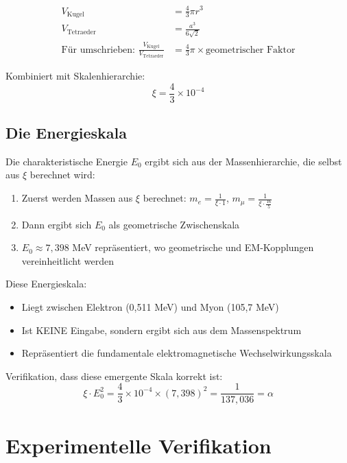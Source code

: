 \documentclass[12pt,a4paper]{article}
\theoremstyle{definition}
\begin{document}
	\begin{align}
		V_{\text{Kugel}} &= \frac{4}{3}\pi r^3\\
		V_{\text{Tetraeder}} &= \frac{a^3}{6\sqrt{2}}\\
		\text{Für umschrieben: } \frac{V_{\text{Kugel}}}{V_{\text{Tetraeder}}} &= \frac{4}{3}\pi \times \text{geometrischer Faktor}
	\end{align}
	
	Kombiniert mit Skalenhierarchie:
	\begin{equation}
		\xi = \frac{4}{3} \times 10^{-4}
	\end{equation}
	
	\subsection{Die Energieskala}
	
	Die charakteristische Energie $E_0$ ergibt sich aus der Massenhierarchie, die selbst aus $\xi$ berechnet wird:
	
	\begin{enumerate}
		\item Zuerst werden Massen aus $\xi$ berechnet: $m_e = \frac{1}{\xi \cdot 1}$, $m_\mu = \frac{1}{\xi \cdot \frac{16}{5}}$
		\item Dann ergibt sich $E_0$ als geometrische Zwischenskala
		\item $E_0 \approx 7,398$ MeV repräsentiert, wo geometrische und EM-Kopplungen vereinheitlicht werden
	\end{enumerate}
	
	Diese Energieskala:
	\begin{itemize}
		\item Liegt zwischen Elektron (0,511 MeV) und Myon (105,7 MeV)
		\item Ist KEINE Eingabe, sondern ergibt sich aus dem Massenspektrum
		\item Repräsentiert die fundamentale elektromagnetische Wechselwirkungsskala
	\end{itemize}
	
	Verifikation, dass diese emergente Skala korrekt ist:
	\begin{equation}
		\xi \cdot E_0^2 = \frac{4}{3} \times 10^{-4} \times (7,398)^2 = \frac{1}{137,036} = \alpha
	\end{equation}
	
	\section{Experimentelle Verifikation}
	
\end{document}
